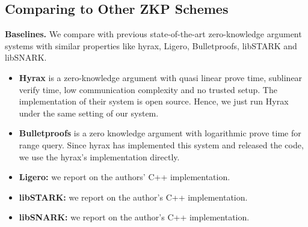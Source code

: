\subsection{Comparing to Other ZKP Schemes}\label{subsec:expZKP}
\textbf{Baselines.} We compare \name{} with previous state-of-the-art zero-knowledge argument systems with similar properties like hyrax\cite{hyrax}, Ligero\cite{ligero}, Bulletproofs\cite{bulletproofs}, libSTARK\cite{libstark} and libSNARK\cite{libsnark}.
\begin{itemize}
\item
\textbf{Hyrax} is a zero-knowledge argument with quasi linear prove time, sublinear verify time, low communication complexity and no trusted setup. The implementation of their system is open source. Hence, we just run Hyrax under the same setting of our system.
\item
\textbf{Bulletproofs} is a zero knowledge argument with logarithmic prove time for range query. Since hyrax has implemented this system and released the code, we use the hyrax's implementation directly.
\item
\textbf{Ligero:} we report on the authors' C++ implementation.
\item
\textbf{libSTARK:} we report on the author's C++ implementation.
\item
\textbf{libSNARK:} we report on the author's C++ implementation.
\end{itemize}
